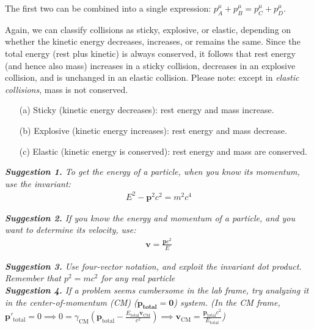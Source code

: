 \documentclass[12pt]{book}
\newcommand{\bm}[1]{\boldsymbol{#1}}
\begin{document}
            The first two can be combined into a single expression: \( p_A^\mu + p_B^\mu = p_C^\mu + p_D^\mu \).
            
            Again, we can classify collisions as sticky, explosive, or elastic, depending on whether the kinetic energy decreases, increases, or remains the same. Since the total energy (rest plus kinetic) is always conserved, it follows that rest energy (and hence also mass) increases in a sticky collision, decreases in an explosive collision, and is unchanged in an elastic collision. Please note: except in \textit{elastic collisions}, mass is not conserved.
            
            \begin{enumerate}
                \item[(a)] Sticky (kinetic energy decreases): rest energy and mass increase.
                \item[(b)] Explosive (kinetic energy increases): rest energy and mass decrease.
                \item[(c)] Elastic (kinetic energy is conserved): rest energy and mass are conserved.
            \end{enumerate}
            
        
        \textit{\textbf{Suggestion 1.} To get the energy of a particle, when you know its momentum, use the invariant:}
        \begin{align}
            E^2-\bm{p}^2c^2=m^2c^4    
        \end{align} 
        
        \textit{\textbf{Suggestion 2.} If you know the energy and momentum of a particle, and you want to determine its velocity, use:}
        \begin{align}
            \bm{v}=\frac{\bm{p}c^2}{E}
        \end{align}
        
        \textit{\textbf{Suggestion 3.} Use four-vector notation, and exploit the invariant dot product. Remember that \(p^2=mc^2\) for any real particle}\\
        
        \textit{\textbf{Suggestion 4.} If a problem seems cumbersome in the lab frame, try analyzing it in the center-of-momentum (CM) (\(\bm{p_{total}=0}\)) system. (In the CM frame, \( \mathbf{p}'_{\text{total}} = 0 \implies 0 = \gamma_{\text{CM}} \left( \mathbf{p}_{\text{total}} - \frac{E_{\text{total}} \mathbf{v}_{\text{CM}}}{c^2} \right) \implies \mathbf{v}_{\text{CM}} = \frac{\mathbf{p}_{\text{total}} c^2}{E_{\text{total}}} \))}
\end{document}

